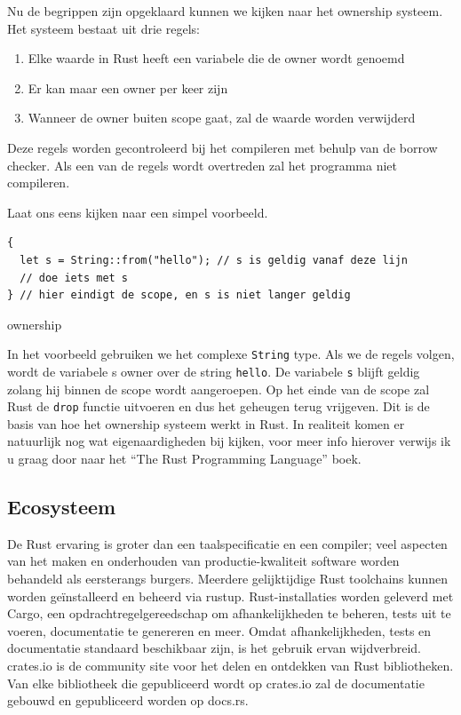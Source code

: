 Nu de begrippen zijn opgeklaard kunnen we kijken naar het ownership systeem. Het systeem bestaat uit
drie regels: 
\begin{enumerate}
  \item Elke waarde in Rust heeft een variabele die de owner wordt genoemd 
  \item Er kan maar een owner per keer zijn 
  \item Wanneer de owner buiten scope gaat, zal de waarde worden verwijderd 
\end{enumerate}

Deze regels worden gecontroleerd bij het compileren met behulp van de borrow checker. Als een van de
regels wordt overtreden zal het programma niet compileren.  

Laat ons eens kijken naar een simpel voorbeeld.

\begin{listing}[h]
\begin{verbatim}
{
  let s = String::from("hello"); // s is geldig vanaf deze lijn
  // doe iets met s
} // hier eindigt de scope, en s is niet langer geldig
\end{verbatim}
\caption{ownership}
\end{listing}

In het voorbeeld gebruiken we het complexe \texttt{String} type. Als we de regels volgen,
wordt de variabele s owner over de string \texttt{hello}. De variabele
\texttt{s} blijft geldig zolang hij binnen de scope wordt aangeroepen. Op het einde van de
scope zal Rust de \texttt{drop} functie uitvoeren en dus het geheugen terug vrijgeven. Dit
is de basis van hoe het ownership systeem werkt in Rust. In realiteit komen er natuurlijk nog wat
eigenaardigheden bij kijken, voor meer info hierover verwijs ik u graag door naar het \enquote{The
Rust Programming Language} boek. \cite{rust_book}

\subsection{Ecosysteem}


De Rust ervaring is groter dan een taalspecificatie en een compiler; veel aspecten van het maken en
onderhouden van productie-kwaliteit software worden behandeld als eersterangs burgers. Meerdere
gelijktijdige Rust toolchains kunnen worden geïnstalleerd en beheerd via rustup. Rust-installaties
worden geleverd met Cargo, een opdrachtregelgereedschap om afhankelijkheden te beheren, tests uit te
voeren, documentatie te genereren en meer. Omdat afhankelijkheden, tests en documentatie standaard
beschikbaar zijn, is het gebruik ervan wijdverbreid. crates.io is de community site voor het delen
en ontdekken van Rust bibliotheken. Van elke bibliotheek die gepubliceerd wordt op crates.io zal de
documentatie gebouwd en gepubliceerd worden op docs.rs.

